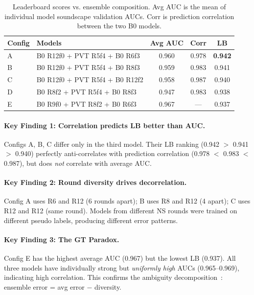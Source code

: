 \documentclass[a4paper]{article}
\begin{document}
\begin{table}[t]
\centering
\caption{Leaderboard scores vs. ensemble composition. Avg AUC is the mean of individual model soundscape validation AUCs. Corr is prediction correlation between the two B0 models.}
\label{tab:diversity}
\small
\begin{tabular}{llccc}
\toprule
Config & Models & Avg AUC & Corr & LB \\
\midrule
A & B0 R12f0 + PVT R5f4 + B0 R6f3  & 0.960 & 0.978 & \textbf{0.942} \\
B & B0 R12f0 + PVT R5f4 + B0 R8f3  & 0.959 & 0.983 & 0.941 \\
C & B0 R12f0 + PVT R5f4 + B0 R12f2 & 0.958 & 0.987 & 0.940 \\
D & B0 R8f2 + PVT R5f4 + B0 R8f3   & 0.947 & 0.983 & 0.938 \\
E & B0 R9f0 + PVT R8f2 + B0 R6f3   & 0.967 & --- & 0.937 \\
\bottomrule
\end{tabular}
\end{table}

\paragraph{Key Finding 1: Correlation predicts LB better than AUC.}
Configs A, B, C differ only in the third model. Their LB ranking (0.942 $>$ 0.941 $>$ 0.940) perfectly anti-correlates with prediction correlation (0.978 $<$ 0.983 $<$ 0.987), but does \emph{not} correlate with average AUC.

\paragraph{Key Finding 2: Round diversity drives decorrelation.}
Config A uses R6 and R12 (6 rounds apart); B uses R8 and R12 (4 apart); C uses R12 and R12 (same round).
Models from different NS rounds were trained on different pseudo labels, producing different error patterns.

\paragraph{Key Finding 3: The GT Paradox.}
Config E has the highest average AUC (0.967) but the lowest LB (0.937).
All three models have individually strong but \emph{uniformly high} AUCs (0.965--0.969), indicating high correlation.
This confirms the ambiguity decomposition~\citep{krogh1994neural}: ensemble error = avg error $-$ diversity.
\end{document}
